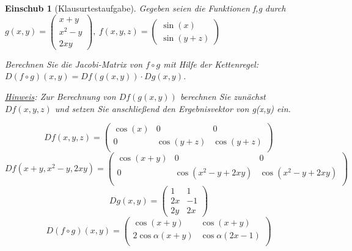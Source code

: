 \documentclass[12pt,a4paper]{scrreprt}
\newtheorem*{einschub}{Einschub}
\begin{document}
	\begin{einschub}[Klausurtestaufgabe]
		Gegeben seien die Funktionen f,g durch $g(x,y)=\begin{pmatrix}
			x+y \\ x^2-y \\ 2xy
		\end{pmatrix},\ f(x,y,z)=\begin{pmatrix}
			\sin(x) \\ \sin(y+z)
		\end{pmatrix}$

		Berechnen Sie die Jacobi-Matrix von $f\circ g$ mit Hilfe der Kettenregel: $D(f\circ g)(x,y)=Df(g(x,y))\cdot Dg(x,y)$.

		\underline{Hinweis}: Zur Berechnung von $Df(g(x,y))$ berechnen Sie zunächst $Df(x,y,z)$ und setzen Sie anschließend den Ergebnisvektor von g(x,y) ein.

		\[Df(x,y,z)=\begin{pmatrix}
			\cos(x) & 0 & 0 \\
			0 & \cos(y+z) & \cos(y+z) \\\end{pmatrix}\]
		\[Df(x+y,x^2-y,2xy)=\begin{pmatrix}
				\cos(x+y) & 0 & 0 \\
				0 & \cos(x^2-y+2xy) & \cos(x^2-y+2xy) \\\end{pmatrix}\]
		\[Dg(x,y)=\begin{pmatrix}
			1 & 1 \\
			2x & -1 \\
			2y & 2x\end{pmatrix}\]
		\[D(f\circ g)(x,y)=\begin{pmatrix}
			\cos(x+y) & \cos(x+y) \\
			2\cos\alpha(x+y) & \cos\alpha(2x-1) \\
		\end{pmatrix}\]
	\end{einschub}
\end{document}

